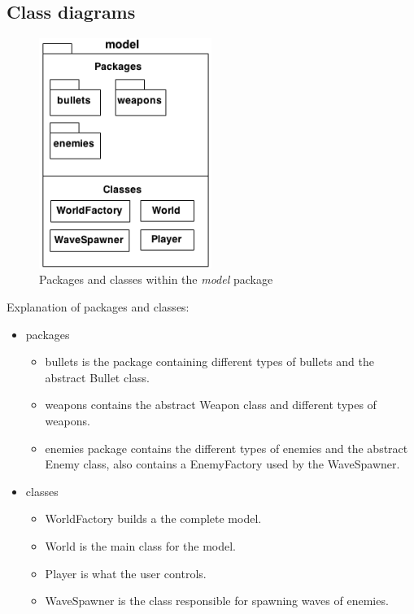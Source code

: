 \documentclass{article}
\begin{document}
\newpage
\begin{appendices}
  \section{Class diagrams}
   
  \begin{figure}[h]
  \centering
  \includegraphics[width=0.5\textwidth]{model.png}
  \caption{Packages and classes within the \textit{model} package}
  \label{fig:model}
  \end{figure}  
  
Explanation of packages and classes:
\begin{itemize}
  \item packages
  \begin{itemize}
    \item bullets is the package containing different types of bullets and the abstract Bullet class.
    \item weapons contains the abstract Weapon class and different types of weapons.
    \item enemies package contains the different types of enemies and the abstract Enemy class, also contains a EnemyFactory used by the WaveSpawner.
  \end{itemize}
  \item classes
  \begin{itemize}
    \item WorldFactory builds a the complete model.
    \item World is the main class for the model.
    \item Player is what the user controls.
    \item WaveSpawner is the class responsible for spawning waves of enemies.
  \end{itemize}
\end{itemize}
  
\end{appendices}
\end{document}
